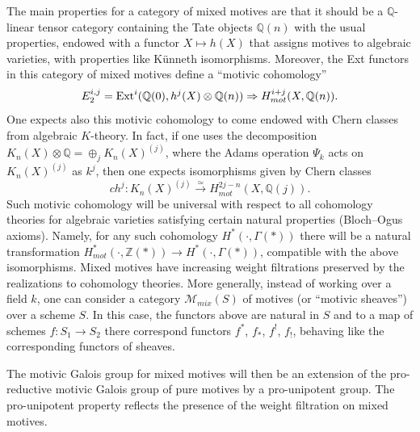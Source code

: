 \documentclass[10pt]{amsart}
\def\Q{{\mathbb Q}}
\def\Z{{\mathbb Z}}
\def\M{{\mathcal M}}
\def\Ext{{\rm Ext}}
\numberwithin{equation}{section}
\begin{document}
The main properties for a category of mixed motives
are that it should be a $\Q$-linear tensor category
containing the Tate objects $\Q(n)$ with the usual
properties, endowed with a functor $X\mapsto h(X)$ that assigns
motives to algebraic varieties, with properties like K\"unneth
isomorphisms. Moreover, the Ext functors in this category of
mixed motives define a ``motivic cohomology''
\begin{equation}\label{motH}
 E^{i,j}_2 = \Ext^i (\Q(0),h^j(X)\otimes \Q(n)) \Rightarrow  H^{i+j}_{mot}(X,\Q(n)).
\end{equation}
One expects also this motivic cohomology to come endowed with Chern
classes from algebraic $K$-theory. In fact, if one uses the decomposition
$K_n(X)\otimes \Q = \oplus_j K_n(X)^{(j)}$, where the Adams operation
$\Psi_k$ acts on $K_n(X)^{(j)}$ as $k^j$, then one expects
isomorphisms given by Chern classes
$$ ch^j: K_n(X)^{(j)} \stackrel{\simeq}{\to}
H_{mot}^{2j-n}(X,\Q(j)). $$
Such motivic cohomology will be universal with respect to all
cohomology theories for algebraic varieties
satisfying certain natural properties (Bloch--Ogus axioms).
Namely, for any such cohomology $H^*(\cdot ,\Gamma(*))$ there
will be a natural transformation
$H^*_{mot}(\cdot, \Z(*)) \to H^*(\cdot,\Gamma(*))$, compatible with
the above isomorphisms.
Mixed motives have increasing weight
filtrations preserved by the realizations to cohomology
theories.
More generally, instead of working over a
field $k$, one can consider a category $\M_{mix}(S)$ of motives (or
``motivic sheaves'') over a scheme $S$. In this case, the functors
above are natural in $S$ and to a map of schemes $f: S_1 \to S_2$ there
correspond functors $f^*$, $f_*$, $f^{!}$, $f_{!}$, behaving like the
corresponding functors of sheaves.

\smallskip

The motivic Galois group for mixed motives will then be an extension of the
pro-reductive motivic Galois group of pure motives by a pro-unipotent
group. The pro-unipotent property reflects the presence of the weight
filtration on mixed motives.

\smallskip
\end{document}
